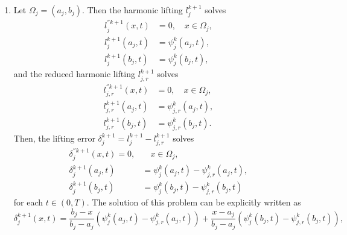 \documentclass[a4paper, 11pt]{article}
\theoremstyle{remark}
\begin{document}
\begin{enumerate}[label = (\arabic*)]
    \begin{align*}
        \left\lVert e_{j, r}^{k+1}(\cdot, t)\right\rVert_{L^{2}(\Omega_{j})} &\leq \left\lVert\eta_{j}^{k+1}(\cdot, t)\right\rVert_{L^{2}(\Omega_{j})} + \sqrt{2}e^{T/2}\left(\int_{0}^{t}\left\lVert \partial_{t}\eta_{j}^{k+1}(\cdot, s)\right\rVert^{2}_{L^{2}(\Omega_{j})}ds\right)^{1/2}\\
        &\quad + C_{mass}\lVert \mathbf{d}_{j}^{k}(t) \rVert_{2} + \sqrt{2}e^{T/2}\left(\int_{0}^{t}\left\lVert \partial_{t}\delta_{j}^{k+1}(\cdot, s)\right\rVert^{2}_{L^{2}(\Omega_{j})} +\lVert \nabla \delta_{j}^{k+1}\rVert^{2}_{L^{2}(\Omega_{j})}\,ds\right)^{1/2},
    \end{align*}

    \item Let $\Omega_{j} = (a_{j}, b_{j})$. Then the harmonic lifting $l_{j}^{k+1}$ solves
    \begin{align*}
        l_{j}^{''k+1}(x, t) &= 0,  \quad x\in \Omega_{j},\\
        l_{j}^{k+1}(a_{j}, t) &= \psi_{j}^{k}(a_{j}, t),\\
        l_{j}^{k+1}(b_{j}, t) &= \psi_{j}^{k}(b_{j}, t),
    \end{align*}
    and the reduced harmonic lifting $l_{j, r}^{k+1}$ solves
    \begin{align*}
        l_{j, r}^{''k+1}(x, t) &= 0, \quad x\in \Omega_{j},\\
        l_{j, r}^{k+1}(a_{j}, t) &= \psi_{j, r}^{k}(a_{j}, t),\\
        l_{j, r}^{k+1}(b_{j}, t) &= \psi_{j, r}^{k}(b_{j}, t).
    \end{align*}
    Then, the lifting error $\delta_{j}^{k+1} = l_{j}^{k+1} - l_{j, r}^{k+1}$ solves
    \begin{align*}
        \delta_{j}^{''k+1}(x, t) = 0, & \quad x\in \Omega_{j},\\
        \delta_{j}^{k+1}(a_{j}, t) &= \psi_{j}^{k}(a_{j}, t) - \psi_{j, r}^{k}(a_{j}, t),\\
        \delta_{j}^{k+1}(b_{j}, t) &= \psi_{j}^{k}(b_{j}, t) - \psi_{j, r}^{k}(b_{j}, t)
    \end{align*} 
    for each $t\in (0, T)$. The solution of this problem can be explicitly written as
    \begin{equation*}
        \delta_{j}^{k+1}(x, t) = \frac{b_{j} - x}{b_{j} - a_{j}}(\psi_{j}^{k}(a_{j}, t) - \psi_{j, r}^{k}(a_{j}, t)) + \frac{x - a_{j}}{b_{j} - a_{j}}(\psi_{j}^{k}(b_{j}, t) - \psi_{j, r}^{k}(b_{j}, t)),
    \end{equation*}

\end{enumerate}
\end{document}
